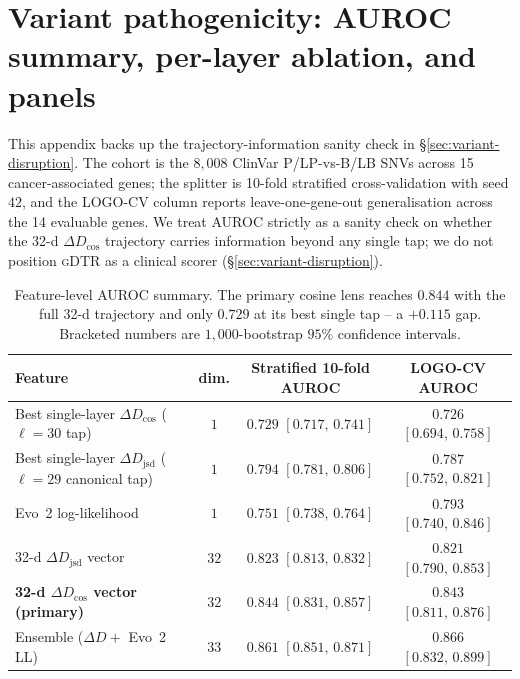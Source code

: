 \documentclass{article}
\theoremstyle{plain}
\theoremstyle{definition}
\theoremstyle{remark}
\newcommand{\gDTR}{\textsc{gDTR}}
\newcommand{\DDcos}{\Delta D_{\cos}}
\newcommand{\DDjsd}{\Delta D_{\mathrm{jsd}}}
\begin{document}
\section{Variant pathogenicity: AUROC summary, per-layer ablation, and panels}
\label{app:auroc-detail}

This appendix backs up the trajectory-information sanity check in
\S\ref{sec:variant-disruption}. The cohort is the $8{,}008$ ClinVar
P/LP-vs-B/LB SNVs across 15 cancer-associated genes; the splitter is
10-fold stratified cross-validation with seed $42$, and the LOGO-CV
column reports leave-one-gene-out generalisation across the 14 evaluable
genes. We treat AUROC strictly as a sanity check on whether the 32-d
$\DDcos$ trajectory carries information beyond any single tap; we do not
position \gDTR{} as a clinical scorer (\S\ref{sec:variant-disruption}).

\begin{table}[!htbp]
\caption{Feature-level AUROC summary. The primary cosine lens reaches
$0.844$ with the full 32-d trajectory and only $0.729$ at its best single
tap -- a $+0.115$ gap. Bracketed numbers are $1{,}000$-bootstrap $95\%$
confidence intervals.}
\label{tab:auroc}
\centering
\small
\begin{tabular}{@{}lccc@{}}
\toprule
Feature & dim. & Stratified 10-fold AUROC & LOGO-CV AUROC \\
\midrule
Best single-layer $\DDcos$ ($\ell=30$ tap) & $1$
   & $0.729$ $[0.717,\, 0.741]$
   & $0.726$ $[0.694,\, 0.758]$ \\
Best single-layer $\DDjsd$ ($\ell=29$ canonical tap) & $1$
   & $0.794$ $[0.781,\, 0.806]$
   & $0.787$ $[0.752,\, 0.821]$ \\
Evo~2 log-likelihood & $1$
   & $0.751$ $[0.738,\, 0.764]$
   & $0.793$ $[0.740,\, 0.846]$ \\
32-d $\DDjsd$ vector & $32$
   & $0.823$ $[0.813,\, 0.832]$
   & $0.821$ $[0.790,\, 0.853]$ \\
\textbf{32-d $\DDcos$ vector (primary)} & $32$
   & $\mathbf{0.844}$ $[0.831,\, 0.857]$
   & $\mathbf{0.843}$ $[0.811,\, 0.876]$ \\
Ensemble ($\Delta D + $ Evo~2 LL) & $33$
   & $0.861$ $[0.851,\, 0.871]$
   & $0.866$ $[0.832,\, 0.899]$ \\
\bottomrule
\end{tabular}
\end{table}
\end{document}
